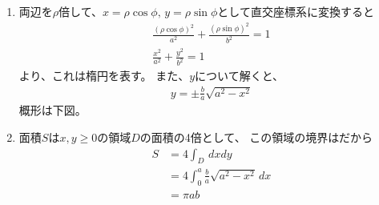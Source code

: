 \begin{ans*}
  ${}$
  \begin{enumerate}[label=(\alph*)]
    \item 両辺を$\rho$倍して、$x = \rho\cos\phi,\,y = \rho\sin\phi$として直交座標系に変換すると
    \begin{gather}
      \frac{(\rho\cos\phi)^2}{a^2} + \frac{(\rho\sin\phi)^2}{b^2} = 1 \\
      \frac{x^2}{a^2} + \frac{y^2}{b^2} = 1
    \end{gather}
    より、これは楕円を表す。
    また、$y$について解くと、
    \begin{gather}
      y = \pm\frac{b}{a} \sqrt{a^2 - x^2}
    \end{gather}
    概形は下図。
    \item
    面積$S$は$x,y\geq 0$の領域$D$の面積の4倍として、
    この領域の境界はだから
    \begin{align}
      S
      &= 4\int_{D} \,dxdy \\
      &= 4\int_{0}^{a}\frac{b}{a}\sqrt{a^2 - x^2} \,dx \\
      &= \pi ab
    \end{align}
  \end{enumerate}
\end{ans*}


